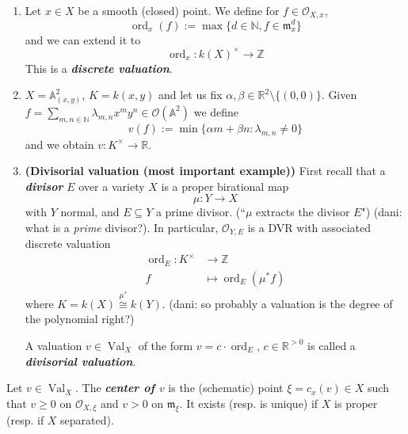 \begin{example}\leavevmode
\begin{enumerate}
\item Let \(x \in X\) be a smooth (closed) point. We define for \(f \in \mathcal{O}_{X,x}\),
	\[\operatorname{ord}_x(f):= \operatorname{max}\{ d \in \mathbb{N}, f \in \mathfrak{m}^d_x\}\]
	and we can extend it to 
	\[\operatorname{ord}_x:k(X)^\times \longrightarrow \mathbb{Z}\]
	This is a \textit{\textbf{discrete valuation}}.
	
\item \(X=\mathbb{A}^2_{(x,y)}\), \(K=k(x,y)\) and let us fix  \(\alpha,\beta \in \mathbb{R}^2\setminus \{(0,0)\}\). Given \(f = \sum_{m,n \in \mathbb{N}}\lambda_{m,n}x^my^n \in \mathcal{O}(\mathbb{A}^2)\) we define
	\[v(f):=\operatorname{min}\{ \alpha m + \beta n: \lambda_{m,n}\neq  0\}\]and we obtain \(v:K^\times \to \mathbb{R}\).
	
\item \textbf{(Divisorial valuation (most important example))} First recall that a \textit{\textbf{divisor}} \(E\) over a variety  \(X\) is a proper birational map
	\[\mu:Y \longrightarrow X\]
	with \(Y\) normal, and \(E \subseteq Y\) a prime divisor. (``\(\mu\) extracts the divisor \(E\)") {\color{6}(dani: what is a \textit{prime} divisor?)}. In particular, \(\mathcal{O}_{Y,E}\) is a DVR with associated discrete valuation
	\begin{align*}
		\operatorname{ord}_E: K^\times &\longrightarrow \mathbb{Z} \\
		f &\longmapsto \operatorname{ord}_E(\mu^*f)
	\end{align*}
	where \(K=k(X) \overset{\mu^*}{\cong}k(Y)\). {\color{7}(dani: so probably a valuation is the degree of the polynomial right?)}

	A valuation \(v \in \operatorname{Val}_X\) of the form \(v = c \cdot \operatorname{ord}_E\), \(c \in \mathbb{R}^{>0}\) is called a \textit{\textbf{divisorial valuation}}.
	
\end{enumerate}
\end{example}

\begin{defn}\leavevmode
Let \(v \in \operatorname{Val}_X\). The \textit{\textbf{center of \(v\)}} is the (schematic) point \(\xi=c_x(v) \in X\) such that \(v \geq 0\) on \(\mathcal{O}_{X,\xi}\) and \(v>0\) on  \(\mathfrak{m}_\xi\). It exists (resp. is unique) if \(X\) is proper (resp. if \(X\) separated).
\end{defn}

